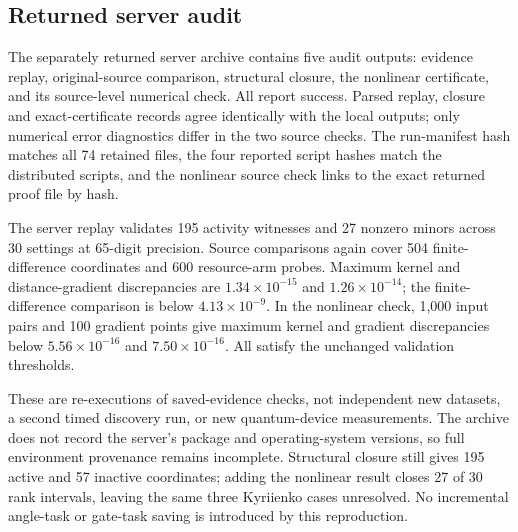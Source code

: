 \subsection{Returned server audit}
The separately returned server archive contains five audit outputs:
evidence replay, original-source comparison, structural closure,
the nonlinear certificate, and its source-level numerical check.
All report success. Parsed replay, closure and exact-certificate
records agree identically with the local outputs; only numerical
error diagnostics differ in the two source checks. The run-manifest
hash matches all 74 retained files, the four reported script hashes
match the distributed scripts, and the nonlinear source check links
to the exact returned proof file by hash.

The server replay validates 195 activity witnesses and 27 nonzero
minors across 30 settings at 65-digit precision. Source comparisons
again cover 504 finite-difference coordinates and 600 resource-arm
probes. Maximum kernel and distance-gradient discrepancies are
$1.34\times10^{-15}$ and $1.26\times10^{-14}$; the finite-difference
comparison is below $4.13\times10^{-9}$. In the nonlinear check,
1,000 input pairs and 100 gradient points give maximum kernel and
gradient discrepancies below $5.56\times10^{-16}$ and
$7.50\times10^{-16}$. All satisfy the unchanged validation thresholds.

These are re-executions of saved-evidence checks, not independent
new datasets, a second timed discovery run, or new quantum-device
measurements. The archive does not record the server's package and
operating-system versions, so full environment provenance remains
incomplete. Structural closure still gives 195 active and 57 inactive
coordinates; adding the nonlinear result closes 27 of 30 rank
intervals, leaving the same three Kyriienko cases unresolved.
No incremental angle-task or gate-task saving is introduced by this
reproduction.
